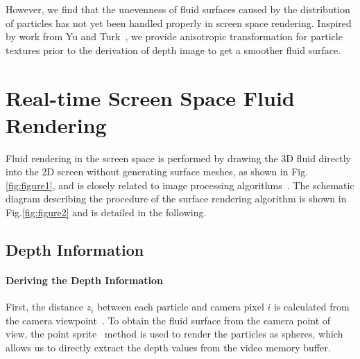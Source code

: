 \documentclass[times,twocolumn,final]{elsarticle}
\begin{document}
However, we find that the unevenness of fluid surfaces caused by the distribution of particles has not yet been handled properly in screen space rendering. Inspired by work from Yu and Turk~\cite{yu2013reconstructing}, we provide anisotropic transformation for particle textures prior to the derivation of depth image to get a smoother fluid surface.


\section{Real-time Screen Space Fluid Rendering}
Fluid rendering in the screen space is performed by drawing the 3D fluid directly into the 2D screen without generating surface meshes, as shown in Fig.\ref{fig:figure1}, and is closely related to image processing algorithms~\cite{ref:green2010screen}. The schematic diagram describing the procedure of the surface rendering algorithm is shown in Fig.\ref{fig:figure2} and is detailed in the following.

\subsection{Depth Information}

\paragraph{Deriving the Depth Information}
First, the distance $z_i$ between each particle and camera pixel $i$ is calculated from the camera viewpoint~\cite{ref:ref20}.
To obtain the fluid surface from the camera point of view, the point sprite~\cite{ref:ref21} method is used to render the particles as spheres, which allows us to directly extract the depth values from the video memory buffer.
\end{document}
